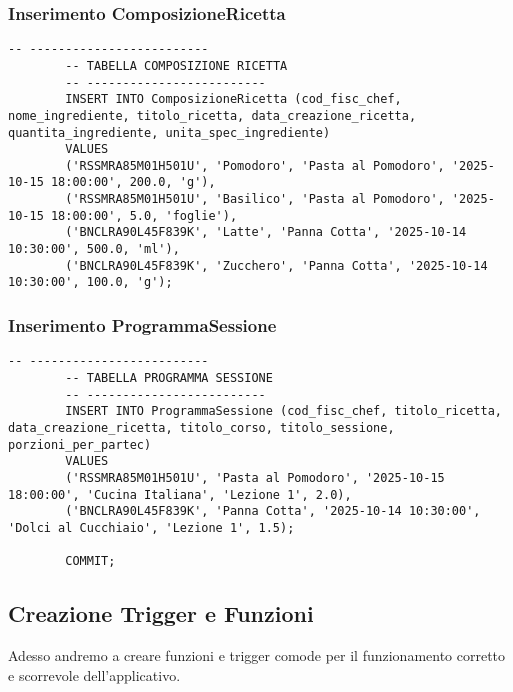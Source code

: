 \documentclass[a4paper, 12pt]{article}
\begin{document}
        \subsubsection{Inserimento ComposizioneRicetta}
        \begin{lstlisting}[style=sqlstyle]
        -- -------------------------
        -- TABELLA COMPOSIZIONE RICETTA
        -- -------------------------
        INSERT INTO ComposizioneRicetta (cod_fisc_chef, nome_ingrediente, titolo_ricetta, data_creazione_ricetta, quantita_ingrediente, unita_spec_ingrediente)
        VALUES
        ('RSSMRA85M01H501U', 'Pomodoro', 'Pasta al Pomodoro', '2025-10-15 18:00:00', 200.0, 'g'),
        ('RSSMRA85M01H501U', 'Basilico', 'Pasta al Pomodoro', '2025-10-15 18:00:00', 5.0, 'foglie'),
        ('BNCLRA90L45F839K', 'Latte', 'Panna Cotta', '2025-10-14 10:30:00', 500.0, 'ml'),
        ('BNCLRA90L45F839K', 'Zucchero', 'Panna Cotta', '2025-10-14 10:30:00', 100.0, 'g');
        \end{lstlisting}
        \newpage
        \subsubsection{Inserimento ProgrammaSessione}
        \begin{lstlisting}[style=sqlstyle]
        -- -------------------------
        -- TABELLA PROGRAMMA SESSIONE
        -- -------------------------
        INSERT INTO ProgrammaSessione (cod_fisc_chef, titolo_ricetta, data_creazione_ricetta, titolo_corso, titolo_sessione, porzioni_per_partec)
        VALUES
        ('RSSMRA85M01H501U', 'Pasta al Pomodoro', '2025-10-15 18:00:00', 'Cucina Italiana', 'Lezione 1', 2.0),
        ('BNCLRA90L45F839K', 'Panna Cotta', '2025-10-14 10:30:00', 'Dolci al Cucchiaio', 'Lezione 1', 1.5);
        
        COMMIT;
        \end{lstlisting}

    \subsection{Creazione Trigger e Funzioni}
    Adesso andremo a creare funzioni e trigger comode per il funzionamento corretto e scorrevole dell'applicativo.
\end{document}
